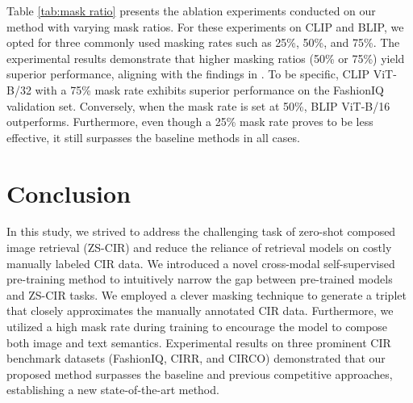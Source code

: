 \documentclass[10pt,twocolumn,letterpaper]{article}
\begin{document}
Table \ref{tab:mask ratio} presents the ablation experiments conducted on our method with varying mask ratios. For these experiments on CLIP and BLIP, we opted for three commonly used masking rates such as 25\%, 50\%, and 75\%. The experimental results demonstrate that higher masking ratios (50\% or 75\%) yield superior performance, aligning with the findings in \cite{li2023scaling, he2022masked}. To be specific, CLIP ViT-B/32 with a 75\% mask rate exhibits superior performance on the FashionIQ validation set. Conversely, when the mask rate is set at 50\%, BLIP ViT-B/16 outperforms. Furthermore, even though a 25\% mask rate proves to be less effective, it still surpasses the baseline methods in all cases.

\section{Conclusion}

In this study, we strived to address the challenging task of zero-shot composed image retrieval (ZS-CIR) and reduce the reliance of retrieval models on costly manually labeled CIR data. We introduced a novel cross-modal self-supervised pre-training method to intuitively narrow the gap between pre-trained models and ZS-CIR tasks. We employed a clever masking technique to generate a triplet that closely approximates the manually annotated CIR data. Furthermore, we utilized a high mask rate during training to encourage the model to compose both image and text semantics. Experimental results on three prominent CIR benchmark datasets (FashionIQ, CIRR, and CIRCO) demonstrated that our proposed method surpasses the baseline and previous competitive approaches, establishing a new state-of-the-art method.





{
    \small
    
    
}
\end{document}

